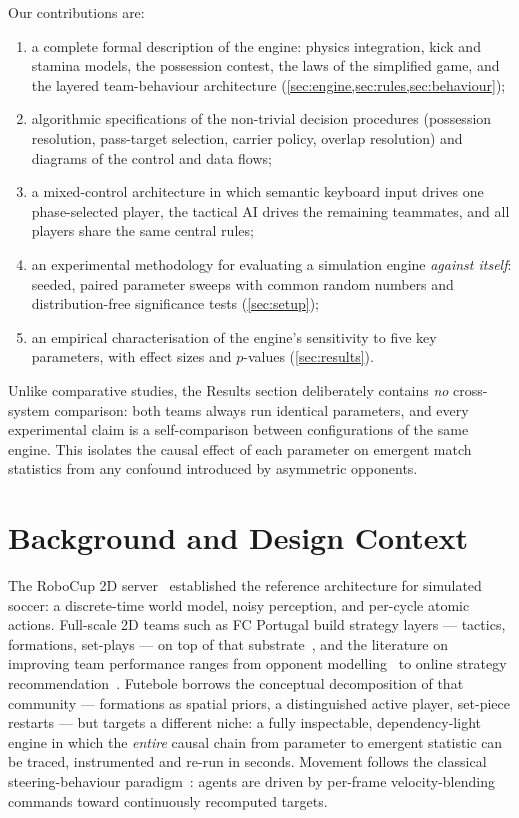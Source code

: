 \documentclass[10pt,twocolumn]{article}
\begin{document}
Our contributions are:
\begin{enumerate}\itemsep1pt
  \item a complete formal description of the engine: physics integration,
        kick and stamina models, the possession contest, the laws of the
        simplified game, and the layered team-behaviour architecture
        (\cref{sec:engine,sec:rules,sec:behaviour});
  \item algorithmic specifications of the non-trivial decision procedures
        (possession resolution, pass-target selection, carrier policy,
        overlap resolution) and diagrams of the control and data flows;
  \item a mixed-control architecture in which semantic keyboard input drives
        one phase-selected player, the tactical AI drives the
        remaining teammates, and all players share the same central rules;
  \item an experimental methodology for evaluating a simulation engine
        \emph{against itself}: seeded, paired parameter sweeps with
        common random numbers and distribution-free significance tests
        (\cref{sec:setup});
  \item an empirical characterisation of the engine's sensitivity to five
        key parameters, with effect sizes and $p$-values
        (\cref{sec:results}).
\end{enumerate}

Unlike comparative studies, the Results section deliberately contains
\emph{no} cross-system comparison: both teams always run identical
parameters, and every experimental claim is a self-comparison between
configurations of the same engine. This isolates the causal effect of each
parameter on emergent match statistics from any confound introduced by
asymmetric opponents.

\section{Background and Design Context}\label{sec:background}

The RoboCup 2D server~\cite{chen2003manual} established the reference
architecture for simulated soccer: a discrete-time world model, noisy
perception, and per-cycle atomic actions. Full-scale 2D teams such as FC
Portugal build strategy layers --- tactics, formations, set-plays --- on top
of that substrate~\cite{abreu2014improving,akiyama2008positioning}, and the
literature on improving team performance ranges from opponent
modelling~\cite{stone2000multiagent} to online strategy
recommendation~\cite{abreu2014improving}. Futebole borrows the conceptual
decomposition of that community --- formations as spatial priors, a
distinguished active player, set-piece restarts --- but targets a different
niche: a fully inspectable, dependency-light engine in which the
\emph{entire} causal chain from parameter to emergent statistic can be
traced, instrumented and re-run in seconds. Movement follows the classical
steering-behaviour paradigm~\cite{reynolds1999steering}: agents are driven
by per-frame velocity-blending commands toward continuously recomputed
targets.
\end{document}
